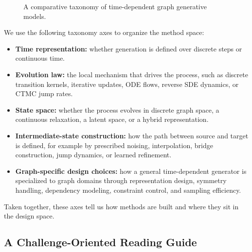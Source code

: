 \documentclass{article}
\begin{document}
\begin{figure}[t]
\caption{A comparative taxonomy of time-dependent graph generative models.}
\label{fig:taxonomy_tdgg}
\end{figure}

We use the following taxonomy axes to organize the method space:
\begin{itemize}[leftmargin=*]
    \item \textbf{Time representation:} whether generation is defined over discrete steps or continuous time.
    \item \textbf{Evolution law:} the local mechanism that drives the process, such as discrete transition kernels, iterative updates, ODE flows, reverse SDE dynamics, or CTMC jump rates.
    \item \textbf{State space:} whether the process evolves in discrete graph space, a continuous relaxation, a latent space, or a hybrid representation.
    \item \textbf{Intermediate-state construction:} how the path between source and target is defined, for example by prescribed noising, interpolation, bridge construction, jump dynamics, or learned refinement.
    \item \textbf{Graph-specific design choices:} how a general time-dependent generator is specialized to graph domains through representation design, symmetry handling, dependency modeling, constraint control, and sampling efficiency.
\end{itemize}

Taken together, these axes tell us how methods are built and where they sit in the design space. 

\subsection{A Challenge-Oriented Reading Guide}
\label{sec:challenge_reading_guide}
\end{document}
